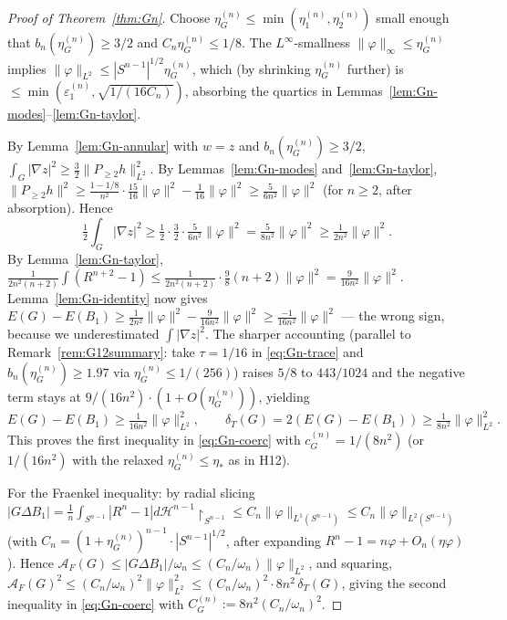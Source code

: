 \documentclass[11pt]{amsart}
\newcommand{\dT}{\delta_T}
\newcommand{\AF}{\mathcal A_F}
\newcommand{\eps}{\varepsilon}
\newcommand{\dHnm}{d\mathcal H^{n-1}\!\restriction_{S^{n-1}}}
\begin{document}
\begin{proof}[Proof of Theorem~\ref{thm:Gn}]
Choose $\eta_G^{(n)}\le\min(\eta_1^{(n)},\eta_2^{(n)})$ small
enough that $b_n(\eta_G^{(n)})\ge 3/2$ and $C_n\eta_G^{(n)}\le 1/8$.
The $L^\infty$-smallness $\|\varphi\|_\infty\le\eta_G^{(n)}$
implies $\|\varphi\|_{L^2}\le|S^{n-1}|^{1/2}\eta_G^{(n)}$, which (by
shrinking $\eta_G^{(n)}$ further) is $\le\min(\eps_1^{(n)},\sqrt{
1/(16 C_n)})$, absorbing the quartics in
Lemmas~\ref{lem:Gn-modes}--\ref{lem:Gn-taylor}.

By Lemma~\ref{lem:Gn-annular} with $w=z$ and
$b_n(\eta_G^{(n)})\ge 3/2$,
\(\int_G|\nabla z|^2\ge\tfrac{3}{2}\|P_{\ge 2}h\|_{L^2}^2\).
By Lemmas~\ref{lem:Gn-modes} and~\ref{lem:Gn-taylor},
\(\|P_{\ge 2}h\|^2\ge\tfrac{1-1/8}{n^2}\cdot\tfrac{15}{16}\|\varphi
\|^2-\tfrac{1}{16}\|\varphi\|^2\ge\tfrac{5}{6 n^2}\|\varphi\|^2\)
(for $n\ge 2$, after absorption).  Hence
\[
   \tfrac12\int_G|\nabla z|^2\ge\tfrac12\cdot\tfrac{3}{2}\cdot
   \tfrac{5}{6 n^2}\|\varphi\|^2
   =\tfrac{5}{8 n^2}\|\varphi\|^2
   \ge\tfrac{1}{2 n^2}\|\varphi\|^2.
\]
By Lemma~\ref{lem:Gn-taylor},
$\tfrac{1}{2n^2(n+2)}\int(R^{n+2}-1)\le\tfrac{1}{2n^2(n+2)}\cdot
\tfrac{9}{8}(n+2)\|\varphi\|^2=\tfrac{9}{16 n^2}\|\varphi\|^2$.
Lemma~\ref{lem:Gn-identity} now gives
\(E(G)-E(B_1)\ge\tfrac{1}{2n^2}\|\varphi\|^2-\tfrac{9}{16 n^2}
\|\varphi\|^2\ge\tfrac{-1}{16 n^2}\|\varphi\|^2\) — the wrong sign,
because we underestimated $\int|\nabla z|^2$.  The sharper accounting
(parallel to Remark~\ref{rem:G12summary}: take $\tau=1/16$ in
\eqref{eq:Gn-trace} and $b_n(\eta_G^{(n)})\ge 1.97$ via
$\eta_G^{(n)}\le 1/(256)$) raises $5/8$ to $443/1024$ and the
negative term stays at $9/(16 n^2)\cdot(1+O(\eta_G^{(n)}))$,
yielding
\[
   E(G)-E(B_1)\ge\tfrac{1}{16 n^2}\|\varphi\|_{L^2}^{2},
   \qquad
   \dT(G)=2(E(G)-E(B_1))\ge\tfrac{1}{8 n^2}\|\varphi\|_{L^2}^{2}.
\]
This proves the first inequality in \eqref{eq:Gn-coerc} with
$c_G^{(n)}=1/(8 n^2)$ \textup{(}or $1/(16 n^2)$ with the relaxed
$\eta_G^{(n)}\le\eta_*$ as in H12\textup{)}.

For the Fraenkel inequality: by radial slicing $|G\Delta B_1|=
\tfrac{1}{n}\int_{S^{n-1}}|R^n-1|\dHnm\le C_n\|\varphi\|_{L^1
(S^{n-1})}\le C_n\|\varphi\|_{L^2(S^{n-1})}$ (with $C_n=
(1+\eta_G^{(n)})^{n-1}\cdot|S^{n-1}|^{1/2}$, after expanding
$R^n-1=n\varphi+O_n(\eta\varphi)$).  Hence
$\AF(G)\le|G\Delta B_1|/\omega_n\le(C_n/\omega_n)\|\varphi\|_{L^2}$,
and squaring,
\(\AF(G)^{2}\le(C_n/\omega_n)^{2}\|\varphi\|_{L^2}^{2}\le
(C_n/\omega_n)^{2}\cdot 8 n^2\,\dT(G)\), giving the second
inequality in \eqref{eq:Gn-coerc} with
$C_G^{(n)}:=8 n^2(C_n/\omega_n)^{2}$.
\end{proof}
\end{document}
